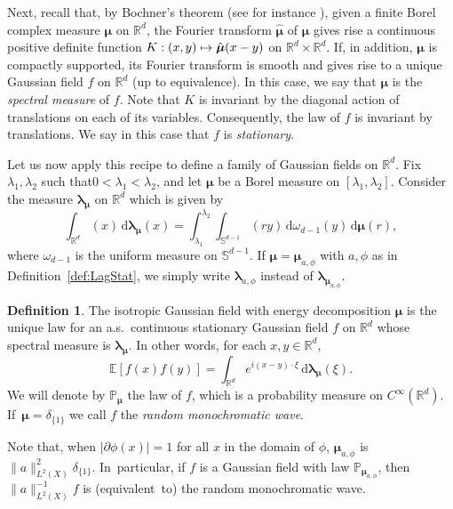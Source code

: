 \documentclass[10pt]{amsart}
\newcommand\mto{\mathchoice{\longmapsto}{\mapsto}{\mapsto}{\mapsto}}
\newcommand{\rd}{\,\mathrm{d}}
\theoremstyle{plain}
\theoremstyle{definition}
\newtheorem{definition}[theorem]{Definition}
\newcommand{\R}{\mathbb{R}}
\newcommand{\E}{\mathbb{E}}
\begin{document}
Next, recall that, by Bochner's theorem (see for instance \cite[\S2.1.11]{CI}), given a finite Borel complex measure $\boldsymbol{\mu}$ on $\R^d$, the Fourier transform $\hat{\boldsymbol{\mu}}$
of $\boldsymbol{\mu}$ gives rise a continuous positive definite function $K:(x,y)\mto \hat{\boldsymbol{\mu}}(x-y)$ on $\R^d\times\R^d$. If, in addition, $\boldsymbol{\mu}$ is compactly supported, its Fourier transform is smooth and gives rise to a unique Gaussian field $f$ on $\R^d$ (up to equivalence). In this case, we say that $\boldsymbol{\mu}$ is the \emph{spectral measure} of $f$. Note that $K$ is invariant by the diagonal action of translations on each of its variables. Consequently, the law of $f$ is invariant by translations. We say in this case that $f$ is \emph{stationary}.

Let us now apply this recipe to define a family of Gaussian fields on $\R^d$. Fix $\lambda_1,\lambda_2$ such that$0<\lambda_1<\lambda_2$, and let $\boldsymbol{\mu}$ be a Borel measure on $[\lambda_1,\lambda_2]$. Consider the measure $\boldsymbol{\lambda_\mu}$ on $\mathbb{R}^d$ which is given by
\begin{equation}\label{eq:measure_def}
\int_{\R^d} (x) \rd \boldsymbol{\lambda_\mu}(x) = \int_{\lambda_1}^{\lambda_2} \int_{\mathbb{S}^{d-1}} (r y) \rd \omega_{d-1}(y) \rd \boldsymbol{\mu}(r),
\end{equation}
where $\omega_{d-1}$ is the uniform measure on $\mathbb{S}^{d-1}$. If $\boldsymbol{\mu}= \boldsymbol{\mu}_{a,\phi}$ with $a, \phi$ as
in Definition~\ref{def:LagStat}, we simply write $\boldsymbol{\lambda}_{a,\phi}$ instead of $\boldsymbol{\lambda}_{\boldsymbol{\mu}_{a,\phi}}$.

\begin{definition}\label{def:spm_to_field}
The isotropic Gaussian field with energy decomposition $\boldsymbol{\mu}$ is the unique law for an a.s.\ continuous stationary Gaussian field $f$ on $\R^d$ whose spectral measure is $\boldsymbol{\lambda_\mu}$. In other words, for each $x,y\in\R^d$,
\[
\E[f(x)f(y)]=\int_{\R^d}e^{i(x-y)\cdot\xi}\rd\boldsymbol{\lambda_\mu}(\xi).
\]
We will denote by $\mathbb{P}_{\boldsymbol{\mu}}$ the law of $f$, which is a probability measure on $C^\infty(\R^d)$. If~$\boldsymbol{\mu}=\delta_{\{1\}}$ we call $f$ the \emph{random monochromatic wave}.
\end{definition}

Note that, when $|\partial \phi(x)|=1$ for all $x$ in the domain of $\phi$, $\boldsymbol{\mu}_{a,\phi}$ is $\|a\|_{L^2(X)}^2\delta_{\{1\}}$. In~particular, if $f$ is a Gaussian field with law $\mathbb{P}_{\boldsymbol{\mu}_{a,\phi}}$, then $\|a\|_{L^2(X)}^{-1} f$ is (equivalent~to) the random monochromatic wave.
\end{document}
